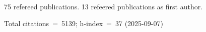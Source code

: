75 refereed publications. 13 refeered publications as first author.

Total citations~=~5139; h-index~=~37 (2025-09-07)